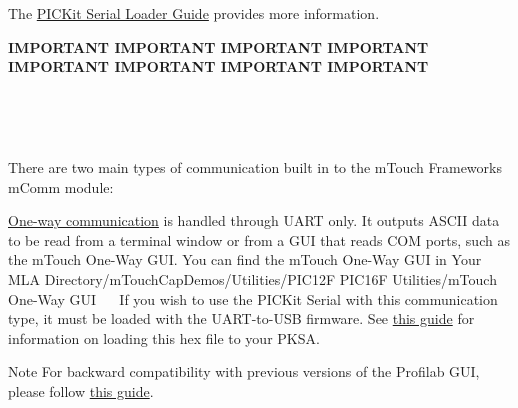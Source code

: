 \begin{center}
\begin{TabularC}{1}
The \hyperlink{PKSARS232}{P\+I\+C\+Kit Serial Loader Guide} provides more information.

\begin{center}{\bfseries I\+M\+P\+O\+R\+T\+A\+N\+T I\+M\+P\+O\+R\+T\+A\+N\+T I\+M\+P\+O\+R\+T\+A\+N\+T I\+M\+P\+O\+R\+T\+A\+N\+T I\+M\+P\+O\+R\+T\+A\+N\+T I\+M\+P\+O\+R\+T\+A\+N\+T I\+M\+P\+O\+R\+T\+A\+N\+T I\+M\+P\+O\+R\+T\+A\+N\+T}\end{center}   \\
\end{TabularC}
\end{center} 

~\newline
~\newline


There are two main types of communication built in to the m\+Touch Framework\textquotesingle{}s m\+Comm module\+: \begin{DoxyItemize}
\item \hyperlink{ts-Comms-1way}{One-\/way communication} is handled through U\+A\+R\+T only. It outputs A\+S\+C\+I\+I data to be read from a terminal window or from a G\+U\+I that reads C\+O\+M ports, such as the m\+Touch One-\/\+Way G\+U\+I. You can find the m\+Touch One-\/\+Way G\+U\+I in {\ttfamily Your M\+L\+A Directory/m\+Touch\+Cap\+Demos/\+Utilities/\+P\+I\+C12\+F P\+I\+C16\+F Utilities/m\+Touch One-\/\+Way G\+U\+I}~\newline
~\newline
 If you wish to use the P\+I\+C\+Kit Serial with this communication type, it must be loaded with the U\+A\+R\+T-\/to-\/\+U\+S\+B firmware. See \hyperlink{PKSARS232}{this guide} for information on loading this hex file to your P\+K\+S\+A.~\newline
 \begin{DoxyNote}{Note}
For backward compatibility with previous versions of the Profilab G\+U\+I, please follow \hyperlink{BCPGUI}{this guide}.~\newline
~\newline
 

\end{DoxyNote}
\end{DoxyItemize}
